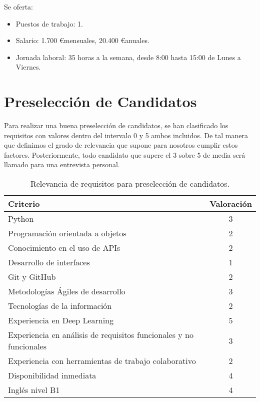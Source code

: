Se oferta:

\begin{itemize}
	\item Puestos de trabajo: 1.
	\item Salario: 1.700 \euro mensuales, 20.400 \euro anuales.
	\item Jornada laboral: 35 horas a la semana, desde 8:00 hasta 15:00 de Lunes a Viernes.
\end{itemize}

\newpage

\section{Preselección de Candidatos}

Para realizar una buena preselección de candidatos, se han clasificado los requisitos con valores dentro del intervalo 0 y 5 ambos incluidos. De tal manera que definimos el grado de relevancia que supone para nosotros cumplir estos factores. Posteriormente, todo candidato que supere el 3 sobre 5 de media será llamado para una entrevista personal.

\begin{table}[H]
	\begin{center}
		\begin{tabular}{|l||c|}
			\hline 
			Criterio & Valoración \\
			\hline \hline
			Python & 3 \\ \hline
			Programación orientada a objetos & 2 \\ \hline
			Conocimiento en el uso de APIs & 2 \\ \hline
			Desarrollo de interfaces & 1 \\ \hline
			Git y GitHub & 2 \\ \hline
			Metodologías Ágiles de desarrollo & 3 \\ \hline
			Tecnologías de la información & 2 \\ \hline
			Experiencia en Deep Learning & 5 \\ \hline
			Experiencia en análisis de requisitos funcionales y no funcionales & 3 \\ \hline
			Experiencia con herramientas de trabajo colaborativo & 2 \\ \hline
			Disponibilidad inmediata & 4 \\ \hline
			Inglés nivel B1 & 4 \\ \hline
		\end{tabular}
		\caption{Relevancia de requisitos para preselección de candidatos.}
		\label{tabla:preseleccion}
	\end{center}
\end{table}

